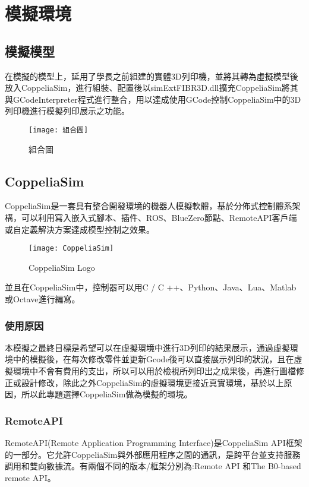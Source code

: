 \chapter{模擬環境}
\section{模擬模型}
 在模擬的模型上，延用了學長之前組建的實體3D列印機，並將其轉為虛擬模型後放入CoppeliaSim，進行組裝、配置後以simExtFIBR3D.dll擴充CoppeliaSim將其與GCodeInterpreter程式進行整合，用以達成使用GCode控制CoppeliaSim中的3D列印機進行模擬列印展示之功能。\\
\begin{figure}[hbt!]
\center
\texttt{[image: 組合圖]}
\caption{\Large 組合圖}
\label{組合圖}
\end{figure}

\newpage

\section{CoppeliaSim}
 CoppeliaSim是一套具有整合開發環境的機器人模擬軟體，基於分佈式控制體系架構，可以利用寫入嵌入式腳本、插件、ROS、BlueZero節點、RemoteAPI客戶端或自定義解決方案達成模型控制之效果。\\
\begin{figure}[hbt!]
\center
\texttt{[image: CoppeliaSim]}
\caption{\Large CoppeliaSim Logo}
\end{figure}

並且在CoppeliaSim中，控制器可以用C / C ++、Python、Java、Lua、Matlab或Octave進行編寫。\\
\subsection{使用原因}
 本模擬之最終目標是希望可以在虛擬環境中進行3D列印的結果展示，通過虛擬環境中的模擬後，在每次修改零件並更新Gcode後可以直接展示列印的狀況，且在虛擬環境中不會有費用的支出，所以可以用於檢視所列印出之成果後，再進行圖檔修正或設計修改，除此之外CoppeliaSim的虛擬環境更接近真實環境，基於以上原因，所以此專題選擇CoppeliaSim做為模擬的環境。\\
\subsection{RemoteAPI}
 RemoteAPI(Remote Application Programming Interface)是CoppeliaSim API框架的一部分。它允許CoppeliaSim與外部應用程序之間的通訊，是跨平台並支持服務調用和雙向數據流。有兩個不同的版本/框架分別為:Remote API 和The B0-based remote API。\\
